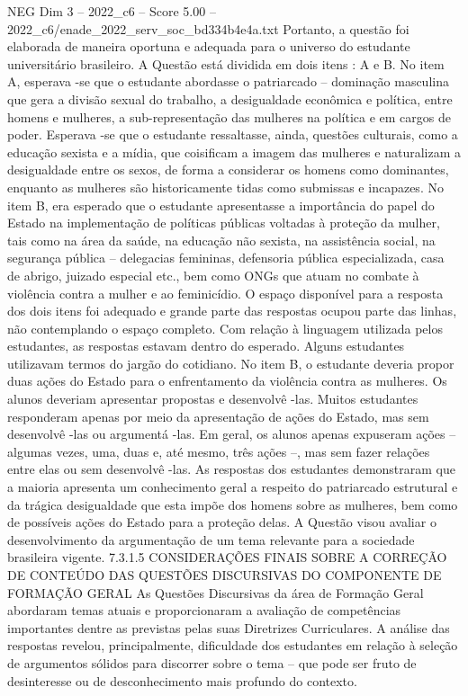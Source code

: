 \begin{textsample}{NEG Dim 3 – 2022\_c6 – Score 5.00 – 2022\_c6/enade\_2022\_serv\_soc\_bd334b4e4a.txt}
Portanto, a questão foi elaborada de maneira oportuna e adequada para o universo do estudante universitário brasileiro.
A Questão está dividida em dois itens : A e B.
No item A, esperava -se que o estudante abordasse o patriarcado – dominação masculina que gera a divisão sexual do trabalho, a desigualdade econômica e política, entre homens e mulheres, a sub-representação das mulheres na política e em cargos de poder.
Esperava -se que o estudante ressaltasse, ainda, questões culturais, como a educação sexista e a mídia, que coisificam a imagem das mulheres e naturalizam a desigualdade entre os sexos, de forma a considerar os homens como dominantes, enquanto as mulheres são historicamente tidas como submissas e incapazes.
No item B, era esperado que o estudante apresentasse a importância do papel do Estado na implementação de políticas públicas voltadas à proteção da mulher, tais como na área da saúde, na educação não sexista, na assistência social, na segurança pública – delegacias femininas, defensoria pública especializada, casa de abrigo, juizado especial etc., bem como ONGs que atuam no combate à violência contra a mulher e ao feminicídio.
O espaço disponível para a resposta dos dois itens foi adequado e grande parte das respostas ocupou parte das linhas, não contemplando o espaço completo.
Com relação à linguagem utilizada pelos estudantes, as respostas estavam dentro do esperado.
Alguns estudantes utilizavam termos do jargão do cotidiano.
No item B, o estudante deveria propor duas ações do Estado para o enfrentamento da violência contra as mulheres.
Os alunos deveriam apresentar propostas e desenvolvê -las.
Muitos estudantes responderam apenas por meio da apresentação de ações do Estado, mas sem desenvolvê -las ou argumentá -las.
Em geral, os alunos apenas expuseram ações – algumas vezes, uma, duas e, até mesmo, três ações –, mas sem fazer relações entre elas ou sem desenvolvê -las.
As respostas dos estudantes demonstraram que a maioria apresenta um conhecimento geral a respeito do patriarcado estrutural e da trágica desigualdade que esta impõe dos homens sobre as mulheres, bem como de possíveis ações do Estado para a proteção delas.
A Questão visou avaliar o desenvolvimento da argumentação de um tema relevante para a sociedade brasileira vigente. 7.3.1.5 CONSIDERAÇÕES FINAIS SOBRE A CORREÇÃO DE CONTEÚDO DAS QUESTÕES DISCURSIVAS DO COMPONENTE DE FORMAÇÃO GERAL As Questões Discursivas da área de Formação Geral abordaram temas atuais e proporcionaram a avaliação de competências importantes dentre as previstas pelas suas Diretrizes Curriculares.
A análise das respostas revelou, principalmente, dificuldade dos estudantes em relação à seleção de argumentos sólidos para discorrer sobre o tema – que pode ser fruto de desinteresse ou de desconhecimento mais profundo do contexto.

\end{textsample}
